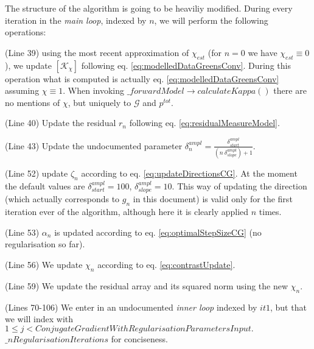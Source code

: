 \documentclass[10pt,a4paper]{article}
\begin{document}
{The structure of the algorithm is going to be heaviliy modified.
During every iteration in the \textit{main loop}, indexed by $n$, we will perform the following operations:}
\begin{enumerate}
\item (Line 39) using the most recent approximation of $\chi_{est} $ (for $n=0$ we have $\chi_{est} \equiv 0$), we update $[\mathcal{K}_\chi]$ following eq. \eqref{eq:modelledDataGreensConv}. 
{During this operation what is computed is actually eq. \eqref{eq:modelledDataGreensConv} assuming $\chi \equiv 1$. When invoking $\_forwardModel\rightarrow calculateKappa()$ there are no mentions of $\chi$, but uniquely to $\mathcal{G}$ and $p^{tot}$.
}
\item (Line 40) Update the residual $r_n$ following eq. \eqref{eq:residualMeasureModel}.
{\item (Line 43) Update the undocumented parameter $\delta^{ampl}_n = \frac{\delta^{ampl}_{start}}{(n \ \delta^{ampl}_{slope}) +1}$.}
\item (Line 52) update $\zeta_n$ according to eq. \eqref{eq:updateDirectionsCG}. At the moment the default values are $\delta^{ampl}_{start} =100$, $\delta^{ampl}_{slope} =10$.
{This way of updating the direction (which actually corresponds to $g_n$ in this document) is valid only for the first iteration ever of the algorithm, although here it is clearly applied $n$ times.}
\item (Line 53)  $\alpha_n$ is updated according to eq. \eqref{eq:optimalStepSizeCG} (no regularisation so far).
\item (Line 56) We update $\chi_n$ according to eq. \eqref{eq:contrastUpdate}.
\item (Line 59) We update the residual array and its squared norm using the new $\chi_n$.
{\item (Lines 70-106) We enter in an undocumented \textit{inner loop} indexed by $it1$, but that we will index with $1\leq j <  ConjugateGradientWithRegularisationParametersInput.$ $ \_nRegularisationIterations$ for conciseness.}
\end{enumerate}
\end{document}

